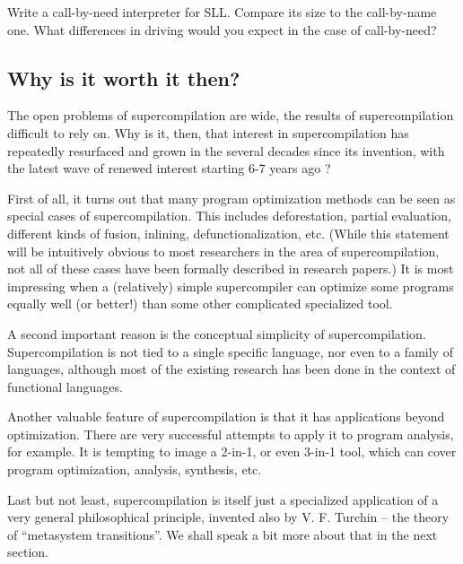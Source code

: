 \begin{exercise}
Write a call-by-need interpreter for SLL. 
Compare its size to the call-by-name one.
What differences in driving would you expect in the case of call-by-need?
\end{exercise}

\subsection{Why is it worth it then?}

The open problems of supercompilation are wide, the results of supercompilation difficult to rely on.
Why is it, then, that interest in supercompilation has repeatedly 
resurfaced and grown in the several decades since its invention,
with the latest wave of renewed interest starting 6-7 years ago 
\cite{Lisitsa2005Towards,Mitchell2007HaskellSCP,Bolingbroke2010Eval,Jonsson2011Phd,Klyuchnikov2009Proving,Reich2010Reduceron,Bolingbroke2011Scp2}?

First of all, it turns out that many program optimization methods can be
seen as special cases of supercompilation.
This includes deforestation, partial evaluation, different kinds of fusion,
inlining, defunctionalization, etc. 
(While this statement will be intuitively obvious to most researchers in the 
area of supercompilation, not all of these cases have been formally
described in research papers.)
It is most impressing when a (relatively) simple supercompiler
can optimize some programs equally well (or better!) than some 
other complicated specialized tool.

A second important reason is the conceptual simplicity of supercompilation.
Supercompilation is not tied to a single specific language, nor even to a family
of languages, although most of the existing research has been done
in the context of functional languages.

Another valuable feature of supercompilation is that it has applications
beyond optimization. 
There are very successful attempts to apply it to program analysis, for example. 
It is tempting to image a 2-in-1, or even 3-in-1 tool,
which can cover program optimization, analysis, synthesis, etc.

Last but not least, supercompilation is itself just a specialized application
of a very general philosophical principle, invented also by V. F. Turchin --
the theory of ``metasystem transitions''. We shall speak a bit more
about that in the next section.

